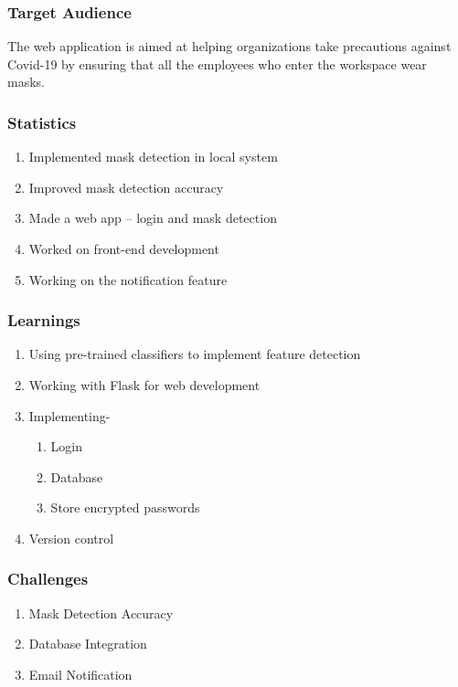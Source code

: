 \documentclass[14pt]{beamer}
\begin{document}
\begin{frame}
    \frametitle{Target Audience}
    The web application is  aimed at helping organizations take precautions against Covid-19 by ensuring that all the employees who enter the workspace wear masks.
\end{frame}

\begin{frame}
    \frametitle{Statistics}
    \begin{enumerate}
        \item Implemented mask detection in local system
        \item Improved mask detection accuracy
        \item Made a web app -- login and mask detection
        \item Worked on front-end development
        \item Working on the notification feature
    \end{enumerate}
\end{frame}

\begin{frame}
    \frametitle{Learnings}
    \begin{enumerate}
        \item Using pre-trained classifiers to implement feature detection
        \item Working with Flask for web development
        \item Implementing-
        \begin{enumerate}
            \item Login 
            \item Database
            \item Store encrypted passwords
        \end{enumerate}
        \item Version control
    \end{enumerate}
\end{frame}

\begin{frame}
    \frametitle{Challenges}
    \begin{enumerate}
        \item Mask Detection Accuracy
        \item Database Integration
        \item Email Notification 
    \end{enumerate}
\end{frame}
\end{document}
